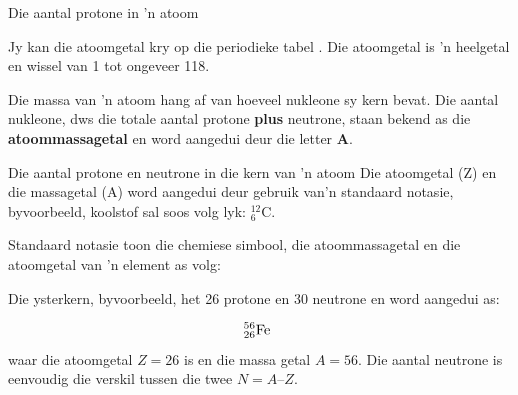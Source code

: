  {Die aantal protone in 'n atoom } 
      
\label{m38745*eip-164}Jy kan die atoomgetal kry op die periodieke tabel . Die atoomgetal is 'n heelgetal en wissel van 1 tot ongeveer 118.\par \label{m38745*id255845}
Die massa van 'n atoom hang af van hoeveel nukleone sy kern bevat. Die aantal nukleone, dws die totale aantal protone \textbf{plus} neutrone, staan ​bekend as die \textbf{atoommassagetal} en word aangedui deur die letter \textbf{A}. \par 

 {Die aantal protone en neutrone in die kern van 'n atoom  } 
Die atoomgetal (Z) en die massagetal (A) word aangedui deur gebruik van'n standaard notasie, byvoorbeeld, koolstof sal soos volg lyk: $_{6}^{12}\text{C}$.

      \label{m38753*id255886}Standaard notasie toon die chemiese simbool, die atoommassagetal en die atoomgetal van 'n element as volg:\par 
      \label{m38753*id255890}
    \setcounter{subfigure}{0}
	\begin{figure}[H] %
    \begin{center}
\end{center}
 \end{figure}       

      
\label{m38753*id255900}
Die ysterkern, byvoorbeeld, het 26 protone en 30 neutrone en word aangedui as:\par 
      \label{m38753*id255904}\nopagebreak\noindent{}      
    \begin{equation*}
    _{26}^{56}\text{Fe}\phantom{\rule{4pt}{0ex}}
      \end{equation*}
      \label{m38753*id255929}
waar die atoomgetal $Z = 26$ is en die massa getal $A = 56$. Die aantal neutrone is
eenvoudig die verskil tussen die twee $N = A – Z$. \par 

